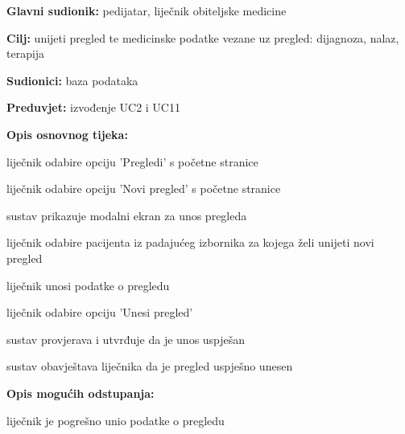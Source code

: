                     \noindent {}
					\begin{packed_item}
	
						\item \textbf{Glavni sudionik: }pedijatar, liječnik obiteljske medicine
						\item  \textbf{Cilj:} unijeti pregled te medicinske podatke vezane uz pregled: dijagnoza, nalaz, terapija
						\item  \textbf{Sudionici:} baza podataka
						\item  \textbf{Preduvjet:} izvođenje UC2 i UC11
						\item  \textbf{Opis osnovnog tijeka:}
						
						\item[] \begin{packed_enum}
							\item liječnik odabire opciju 'Pregledi' s početne stranice
							\item liječnik odabire opciju 'Novi pregled' s početne stranice
							\item sustav prikazuje modalni ekran za unos pregleda
							\item liječnik odabire pacijenta iz padajućeg izbornika za kojega želi unijeti novi pregled
							\item liječnik unosi podatke o pregledu
							\item liječnik odabire opciju 'Unesi pregled'
							\item sustav provjerava i utvrđuje da je unos uspješan
							\item sustav obavještava liječnika da je pregled uspješno unesen

						\end{packed_enum}

						\item  \textbf{Opis mogućih odstupanja:}
						
						\item[] \begin{packed_item}
	
							\item[7.a] liječnik je pogrešno unio podatke o pregledu
							\item[] \begin{packed_enum}
								

\end{packed_enum}
\end{packed_item}
\end{packed_item}
